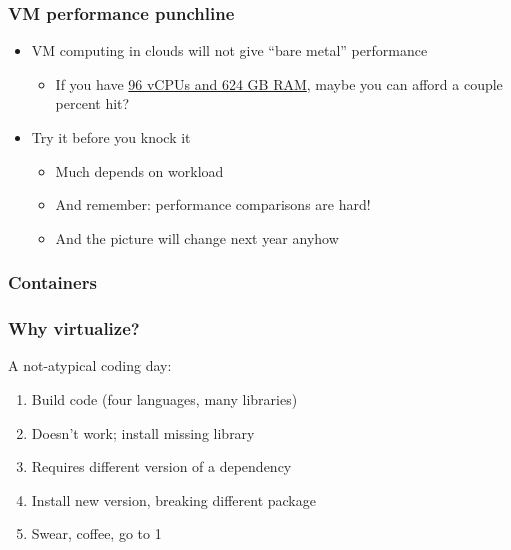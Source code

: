 \documentclass{beamer}
\begin{document}
\begin{frame}
  \frametitle{VM performance punchline}

  \begin{itemize}
  \item VM computing in clouds will not give ``bare metal''
    performance
    \begin{itemize}
    \item If you have
      \href{https://cloudplatform.googleblog.com/2017/10/new-compute-engine-machine-types.html}{96
        vCPUs and 624 GB RAM}, maybe you can afford a couple percent hit?
    \end{itemize}
  \item Try it before you knock it
    \begin{itemize}
    \item Much depends on workload
    \item And remember: performance comparisons are hard!
    \item And the picture will change next year anyhow
    \end{itemize}
  \end{itemize}
\end{frame}


\begin{frame}
  \frametitle{Containers}
\end{frame}


\begin{frame}
  \frametitle{Why virtualize?}

  A not-atypical coding day:
  \begin{enumerate}
  \item Build code (four languages, many libraries)
  \item Doesn't work; install missing library
  \item Requires different version of a dependency
  \item Install new version, breaking different package
  \item Swear, coffee, go to 1
  \end{enumerate}
\end{frame}
\end{document}
